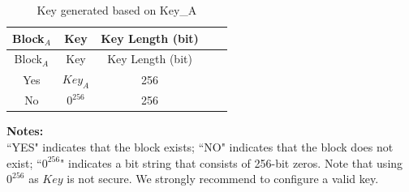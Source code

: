 \begin{longtable}[c]{ |c|c|c|c|c| }
\caption{Key generated based on Key\_A}
\label{tab:extmemencr-key-possibility}
\\\hline 
\rowcolor{lightgray}
Block$_A$ & Key  & Key Length (bit) \\\hline
\endfirsthead
\hline
\rowcolor{lightgray}
Block$_A$ & Key  & Key Length (bit) \\\hline
\endhead
\endfoot
Yes       &   $\mathit{Key}_{A}$    &   256   \\\hline
No        &   $0^{256}$    &   256   \\\hline
\end{longtable}
\vspace{-1.5em}
{\bfseries Notes: }\\
``YES" indicates that the block exists; ``NO" indicates that the block does not exist; ``$0^{256}$" indicates a bit string that consists of 256-bit zeros.
Note that using $0^{256}$ as $\mathit{Key}$ is not secure. We strongly recommend to configure a valid key.
